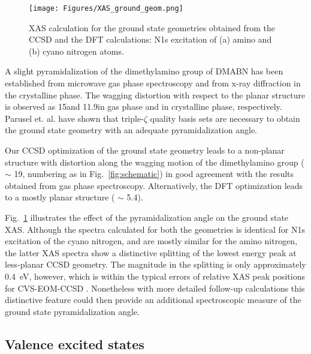 \documentclass[journal=jacsat,manuscript=article]{achemso}
\begin{document}
\begin{figure}
\texttt{[image: Figures/XAS\_ground\_geom.png]}\caption{XAS calculation for the ground state geometries obtained from the CCSD and the DFT calculations: N1s excitation of (a) amino and (b) cyano nitrogen atoms. \label{fig:XAS-ground}}
\end{figure}

A slight pyramidalization of the dimethylamino group of DMABN has been established from microwave gas phase spectroscopy\cite{kajimoto1991structure} and from x-ray diffraction in the crystalline phase\cite{heine1994structure}. The wagging distortion with respect to the planar structure is observed as 15\degree and 11.9\degree in gas phase and in crystalline phase, respectively. Parusel et. al. have shown that triple-$\zeta$ quality basis sets are necessary to obtain the ground state geometry with an adequate pyramidalization angle.\cite{parusel1998density}

Our CCSD optimization of the ground state geometry leads to a non-planar structure with distortion along the wagging motion of the dimethylamino group ( $\sim$ 19\degree, numbering as in Fig.~\ref{fig:schematic}) in good agreement with the results obtained from gas phase spectroscopy.\cite{kajimoto1991structure} Alternatively, the DFT optimization leads to a mostly planar structure ( $\sim$ 5.4\degree).

Fig.~\ref{fig:XAS-ground} illustrates the effect of the pyramidalization angle on the ground state XAS. Although the spectra calculated for both the geometries is identical for N1s excitation of the cyano nitrogen, and are mostly similar for the amino nitrogen, the latter XAS spectra show a distinctive splitting of the lowest energy peak at less-planar CCSD geometry. The magnitude in the splitting is only approximately \SI{0.4}{eV}, however, which is within the typical errors of relative XAS peak positions for CVS-EOM-CCSD \cite{matthewsEOMCCMethodsApproximate2020}. Nonetheless with more detailed follow-up calculations this distinctive feature could then provide an additional spectroscopic measure of the ground state pyramidalization angle.

\subsection{Valence excited states} 
\end{document}
